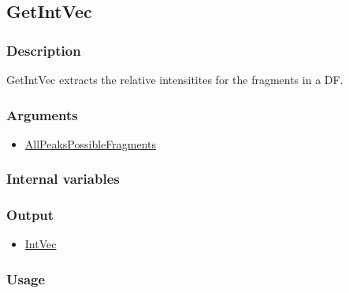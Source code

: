 \subsection{GetIntVec}\label{GetIntVec}
\subsubsection{Description}
GetIntVec extracts the relative intensitites for the fragments in a DF.
\subsubsection{Arguments}
\begin{itemize}
\item \hyperref[AllPeaksPossibleFragments]{AllPeaksPossibleFragments}
\end{itemize}
\subsubsection{Internal variables}
\subsubsection{Output}
\begin{itemize}
\item \hyperref[IntVec]{IntVec} 
\end{itemize}
\subsubsection{Usage}
